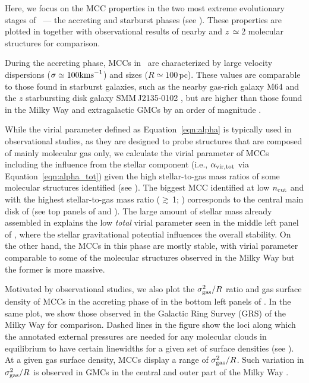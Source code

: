 \IfFileExists{emulateapjlegacy.cls}{\documentclass[iop]{emulateapjlegacy}}{\documentclass[iop]{emulateapj}}
\begin{document}
Here, we focus on the MCC properties in the two most extreme evolutionary stages of \flower\ --- the accreting and starburst phases (see ). These properties are plotted in  together with observational results of nearby and $z$\,$\simeq$2 molecular structures for comparison.

During the accreting phase, MCCs in \flower\ are characterized by large velocity dispersions ($\sigma \simeq 100 {\rm km s}^{-1}$) and sizes ($R\simeq 100$\,pc). These values are comparable to those found in starburst galaxies, such as the nearby gas-rich galaxy M64 and the $z$ starbursting disk galaxy SMM\,J2135-0102 \citep{Rosolowsky05a, Swinbank11a}, but are higher than those found in the Milky Way and extragalactic GMCs by an order of magnitude \citep{Heyer04a, Bolatto08a}.

While the virial parameter defined as Equation~\ref{eqn:alpha} is typically used in observational studies, as they are designed to probe structures that are composed of mainly molecular gas only, we calculate the virial parameter of MCCs including the influence from the stellar component (i.e., $\alpha_{\rm vir, tot}$ via Equation~\ref{eqn:alpha_tot}) given the high stellar-to-gas mass ratios of some molecular structures identified (see ).
% 
The biggest MCC identified at low $n_{\rm cut}$ and with the highest stellar-to-gas mass ratio ($\gtrsim$\,1; ) corresponds to the central main disk of \flower (see top panels of  and ). The large amount of stellar mass already assembled in \flower explains the low {\em total} virial parameter seen in the middle left panel of , where the stellar gravitational potential influences the overall stability. On the other hand, the MCCs in this phase are mostly stable, with 
virial parameter comparable to some of the molecular structures observed in the Milky Way but the former is more massive.

Motivated by observational studies, we also plot the $\sigma_{\rm gas}^2/R$ ratio and gas surface density of MCCs in the accreting phase of \flower in the bottom left panels of . In the same plot, we show those observed in the Galactic Ring Survey (GRS) of the Milky Way \citep{Heyer09a} for comparison. Dashed lines in the figure show the loci along which the annotated external pressures are needed for any molecular clouds in equilibrium to have certain linewidths for a given set of surface densities (see ). 
At a given gas surface density, MCCs display a range of $\sigma_{\rm gas}^2/R$. 
Such variation in $\sigma_{\rm gas}^2/R$ is observed in GMCs in the central and outer part of the Milky Way \citep{Oka01a, Heyer09a}.
\end{document}
